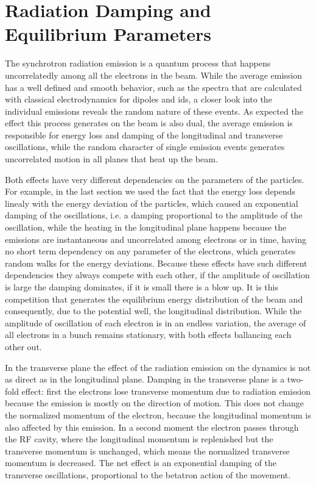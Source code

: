 \section{Radiation Damping and Equilibrium Parameters}

    The synchrotron radiation emission is a quantum process that happens uncorrelatedly among all the electrons in the beam. While the average emission has a well defined and smooth behavior, such as the spectra that are calculated with classical electrodynamics for dipoles and \glspl{id}, a closer look into the individual emissions reveals the random nature of these events. As expected the effect this process generates on the beam is also dual, the average emission is responsible for energy loss and damping of the longitudinal and transverse oscillations, while the random character of single emission events generates uncorrelated motion in all planes that heat up the beam.

    Both effects have very different dependencies on the parameters of the particles. For example, in the last section we used the fact that the energy loss depends linealy with the energy deviation of the particles, which caused an exponential damping of the oscillations, i.e. a damping proportional to the amplitude of the oscillation, while the heating in the longitudinal plane happens because the emissions are instantaneous and uncorrelated among electrons or in time, having no short term dependency on any parameter of the electrons, which generates random walks for the energy deviations. Because these effects have such different dependencies they always compete with each other, if the amplitude of oscillation is large the damping dominates, if it is small there is a blow up. It is this competition that generates the equilibrium energy distribution of the beam and consequently, due to the potential well, the longitudinal distribution. While the amplitude of oscillation of each electron is in an endless variation, the average of all electrons in a bunch remains stationary, with both effects ballancing each other out.

    In the transverse plane the effect of the radiation emission on the dynamics is not as direct as in the longitudinal plane. Damping in the transverse plane is a two-fold effect: first the electrons lose transverse momentum due to radiation emission because the emission is mostly on the direction of motion. This does not change the normalized momentum of the electron, because the longitudinal momentum is also affected by this emission. In a second moment the electron passes through the RF cavity, where the longitudinal momentum is replenished but the transverse momentum is unchanged, which means the normalized transverse momentum is decreased. The net effect is an exponential damping of the transverse oscillations, proportional to the betatron action of the movement.

